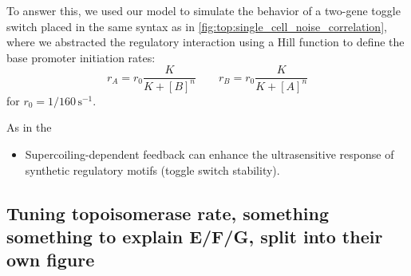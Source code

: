 \documentclass[11pt]{article}
\begin{document}
To answer this, we used our model to simulate the behavior of a two-gene toggle switch placed in the same syntax as in \cref{fig:top:single_cell_noise_correlation}, where we abstracted the regulatory interaction using a Hill function to define the base promoter initiation rates:
\begin{equation}
    r_A = r_0 \frac{K}{K + [B]^n} \qquad r_B = r_0 \frac{K}{K + [A]^n}
\end{equation}
for \(r_0 = 1/160 \,\text{s}^{-1}\).

As in the

\begin{itemize}
\item Supercoiling-dependent feedback can enhance the ultrasensitive response of synthetic regulatory motifs (toggle switch stability).
\end{itemize}

\subsection{Tuning topoisomerase rate, something something to explain E/F/G, split into their own figure}
\end{document}

